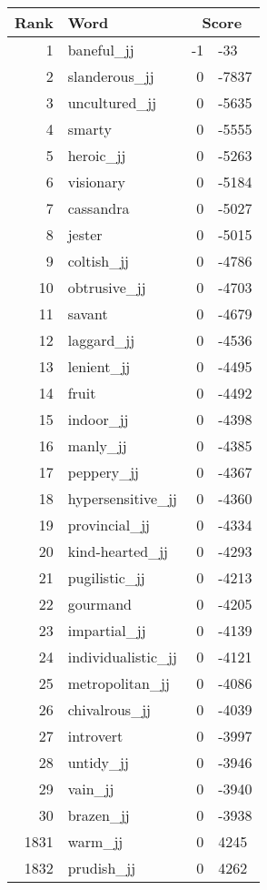 \begin{longtable}[!htbp]{| rlr@{.}l |}
    \hline
    \textbf{Rank} & \textbf{Word} & \multicolumn{2}{c|}{\textbf{Score}} \\
    \hline
    \endhead
    1 & baneful\_jj & -1 & -33 \\
    2 & slanderous\_jj & 0 & -7837 \\
    3 & uncultured\_jj & 0 & -5635 \\
    4 & smarty & 0 & -5555 \\
    5 & heroic\_jj & 0 & -5263 \\
    6 & visionary & 0 & -5184 \\
    7 & cassandra & 0 & -5027 \\
    8 & jester & 0 & -5015 \\
    9 & coltish\_jj & 0 & -4786 \\
    10 & obtrusive\_jj & 0 & -4703 \\
    11 & savant & 0 & -4679 \\
    12 & laggard\_jj & 0 & -4536 \\
    13 & lenient\_jj & 0 & -4495 \\
    14 & fruit & 0 & -4492 \\
    15 & indoor\_jj & 0 & -4398 \\
    16 & manly\_jj & 0 & -4385 \\
    17 & peppery\_jj & 0 & -4367 \\
    18 & hypersensitive\_jj & 0 & -4360 \\
    19 & provincial\_jj & 0 & -4334 \\
    20 & kind-hearted\_jj & 0 & -4293 \\
    21 & pugilistic\_jj & 0 & -4213 \\
    22 & gourmand & 0 & -4205 \\
    23 & impartial\_jj & 0 & -4139 \\
    24 & individualistic\_jj & 0 & -4121 \\
    25 & metropolitan\_jj & 0 & -4086 \\
    26 & chivalrous\_jj & 0 & -4039 \\
    27 & introvert & 0 & -3997 \\
    28 & untidy\_jj & 0 & -3946 \\
    29 & vain\_jj & 0 & -3940 \\
    30 & brazen\_jj & 0 & -3938 \\
    1831 & warm\_jj & 0 & 4245 \\
    1832 & prudish\_jj & 0 & 4262 \\

\end{longtable}
